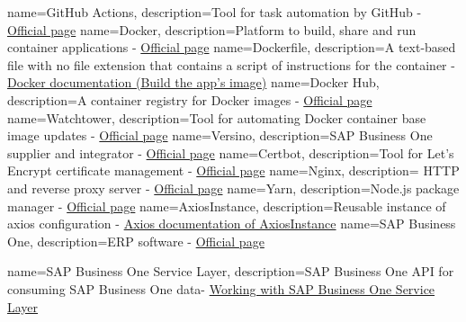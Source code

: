 {
        name=GitHub Actions,
        description={Tool for task automation by GitHub - \href{https://github.com/features/actions}{Official page}}
}
{
        name=Docker,
        description={Platform to build, share and run container applications - \href{https://www.docker.com}{Official page}}
}
{
        name=Dockerfile,
        description={A text-based file with no file extension that contains a script of instructions for the container - \href{https://docs.docker.com/get-started/02_our_app/#build-the-apps-image}{Docker documentation (Build the app's image)}}
}
{
        name=Docker Hub,
        description={A container registry for Docker images - \href{https://hub.docker.com}{Official page}}
}
{
        name=Watchtower,
        description={Tool for automating Docker container base image updates - \href{https://containrrr.dev/watchtower/}{Official page}}
}
{
        name=Versino,
        description={SAP Business One supplier and integrator -  \href{https://www.versino.cz/cs-cz/}{Official page}}
}
{
        name=Certbot,
        description={Tool for Let's Encrypt certificate management -  \href{https://certbot.eff.org}{Official page}}
}
{
        name=Nginx,
        description={ HTTP and reverse proxy server -  \href{https://www.nginx.com}{Official page}}
}
{
        name=Yarn,
        description={Node.js package manager -  \href{https://www.yarnpkg.com}{Official page}}
}
{
        name=AxiosInstance,
        description={Reusable instance of axios configuration -  \href{https://axios-http.com/docs/instance}{Axios documentation of AxiosInstance}}
}
{
        name=SAP Business One,
        description={ERP software -  \href{https://www.sap.com/products/erp/business-one.html}{Official page}}
}

{
        name=SAP Business One Service Layer,
        description={SAP Business One API for consuming SAP Business One data-  \href{https://help.sap.com/doc/0d2533ad95ba4ad7a702e83570a21c32/9.3/en-US/Working_with_SAP_Business_One_Service_Layer.pdf}{Working with SAP Business One Service Layer}}
}

